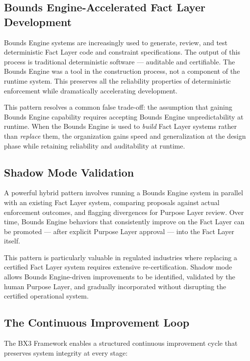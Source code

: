 \documentclass[12pt]{article}
\begin{document}
\subsection{Bounds Engine-Accelerated Fact Layer Development}

Bounds Engine systems are increasingly used to generate, review, and test deterministic Fact Layer code and constraint specifications. The output of this process is traditional deterministic software --- auditable and certifiable. The Bounds Engine was a tool in the construction process, not a component of the runtime system. This preserves all the reliability properties of deterministic enforcement while dramatically accelerating development.

This pattern resolves a common false trade-off: the assumption that gaining Bounds Engine capability requires accepting Bounds Engine unpredictability at runtime. When the Bounds Engine is used to \textit{build} Fact Layer systems rather than \textit{replace} them, the organization gains speed and generalization at the design phase while retaining reliability and auditability at runtime.

\subsection{Shadow Mode Validation}

A powerful hybrid pattern involves running a Bounds Engine system in parallel with an existing Fact Layer system, comparing proposals against actual enforcement outcomes, and flagging divergences for Purpose Layer review. Over time, Bounds Engine behaviors that consistently improve on the Fact Layer can be promoted --- after explicit Purpose Layer approval --- into the Fact Layer itself.

This pattern is particularly valuable in regulated industries where replacing a certified Fact Layer system requires extensive re-certification. Shadow mode allows Bounds Engine-driven improvements to be identified, validated by the human Purpose Layer, and gradually incorporated without disrupting the certified operational system.

\subsection{The Continuous Improvement Loop}

The BX3 Framework enables a structured continuous improvement cycle that preserves system integrity at every stage:
\end{document}
